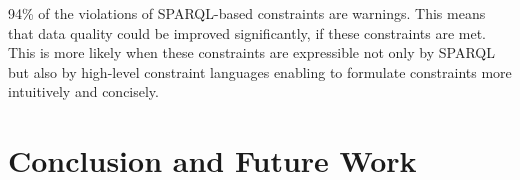 \documentclass[conference]{IEEEtran}
\begin{document}

94\% of the violations of SPARQL-based constraints are warnings. This
means that data quality could be improved significantly, if these
constraints are met. This is more likely when these constraints
are expressible not only by SPARQL but also by high-level
constraint languages enabling to formulate constraints more
intuitively and concisely.





\section{Conclusion and Future Work}
\end{document}
